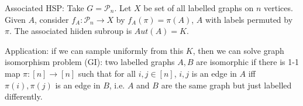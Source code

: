\documentclass[a4paper]{article}
\begin{document}
Associated HSP: Take $G = \mathcal{P}_n$. Let $X$ be set of all labelled graphs on $n$ vertices. Given $A$, consider $f_A: \mathcal{P}_n \to X$ by $f_A(\pi) = \pi(A)$, $A$ with labels permuted by $\pi$. The associated hiiden subroup is $Aut(A) = K$.

Application: if we can sample uniformly from this $K$, then we can solve graph isomorphism problem (GI): two labelled graphs $A,B$ are isomorphic if there is 1-1 map $\pi:[n] \to [n]$ such that for all $i,j \in [n]$, $i,j$ is an edge in $A$ iff $\pi(i),\pi(j)$ is an edge in $B$, i.e. $A$ and $B$ are the same graph but just labelled differently.
\end{document}
